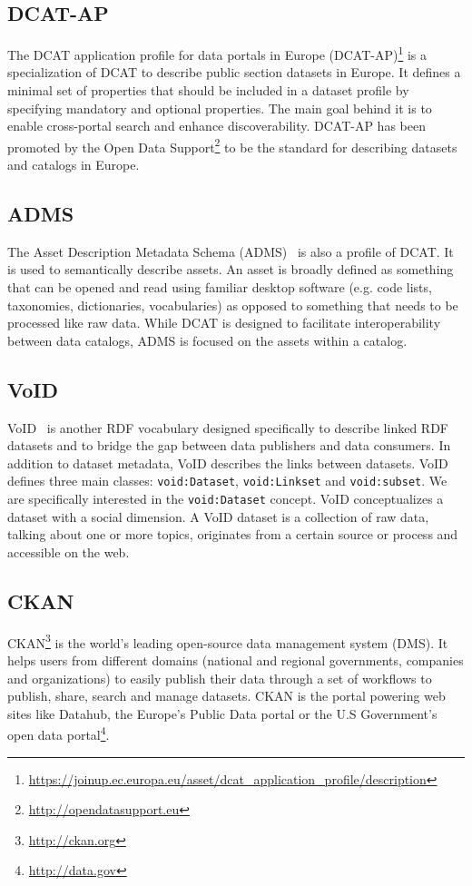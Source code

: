 \documentclass[runningheads,a4paper]{../../Tools/LaTEX/llncs}
\begin{document}
\subsection{DCAT-AP}
The DCAT application profile for data portals in Europe (DCAT-AP)\footnote{\url{https://joinup.ec.europa.eu/asset/dcat\_application\_profile/description}} is a specialization of DCAT to describe public section datasets in Europe. It defines a minimal set of properties that should be included in a dataset profile by specifying mandatory and optional properties. The main goal behind it is to enable cross-portal search and enhance discoverability. DCAT-AP has been promoted by the Open Data Support\footnote{\url{http://opendatasupport.eu}} to be the standard for describing datasets and catalogs in Europe.

\subsection{ADMS}
The Asset Description Metadata Schema (ADMS)~\cite{Archer:W3C:13} is also a profile of DCAT. It is used to semantically describe assets. An asset is broadly defined as something that can be opened and read using familiar desktop software (e.g. code lists, taxonomies, dictionaries, vocabularies) as opposed to something that needs to be processed like raw data. While DCAT is designed to facilitate interoperability between data catalogs, ADMS is focused on the assets within a catalog.

\subsection{VoID}
VoID~\cite{Bohm:WebSemJournal:11} is another RDF vocabulary designed specifically to describe linked RDF datasets and to bridge the gap between data publishers and data consumers. In addition to dataset metadata, VoID describes the links between datasets. VoID defines three main classes: \texttt{void:Dataset}, \texttt{void:Linkset} and \texttt{void:subset}. We are specifically interested in the \texttt{void:Dataset} concept. VoID conceptualizes a dataset with a social dimension. A VoID dataset is a collection of raw data, talking about one or more topics, originates from a certain source or process and accessible on the web.

\subsection{CKAN}
CKAN\footnote{\url{http://ckan.org}} is the world's leading open-source data management system (DMS). It helps users from different domains (national and regional governments, companies and organizations) to easily publish their data through a set of workflows to publish, share, search and manage datasets. CKAN is the portal powering web sites like Datahub, the Europe's Public Data portal or the U.S Government's open data portal\footnote{\url{http://data.gov}}.
\end{document}
